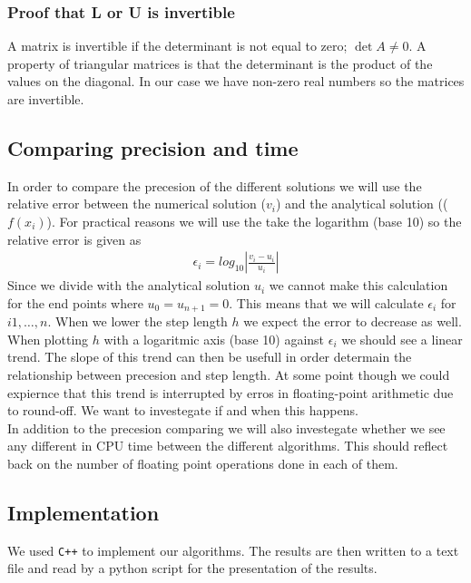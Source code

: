 \documentclass[american,a4paper,12pt]{article}
\begin{document}
\subsubsection*{Proof that L or U is invertible}
A matrix is invertible if the determinant is not equal to zero; $\det A \neq 0$. A property of triangular matrices is that the determinant is the product of the values on the diagonal. In our case we have non-zero real numbers so the matrices are invertible.

\subsection{Comparing precision and time}
In order to compare the precesion of the different solutions we will use the relative error between the numerical solution ($v_i$) and the analytical solution (($f(x_i)$). For practical reasons we will use the take the logarithm (base 10) so the relative error is given as
\begin{align*}
  \epsilon_i = log_{10}\left|\frac{v_i - u_i}{u_i}\right|
\end{align*}
Since we divide with the analytical solution $u_i$ we cannot make this calculation for the end points where $u_0 = u_{n+1} = 0$. This means that we will calculate $\epsilon_i$ for $i 1, \hdots, n$. When we lower the step length $h$ we expect the error to decrease as well. When plotting $h$ with a logaritmic axis (base 10) against $\epsilon_i$ we should see a linear trend. The slope of this trend can then be usefull in order determain the relationship between precesion and step length. At some point though we could expiernce that this trend is interrupted by erros in floating-point arithmetic due to round-off. We want to investegate if and when this happens.\\
In addition to the precesion comparing we will also investegate whether we see any different in CPU time between the different algorithms. This should reflect back on the number of floating point operations done in each of them.
\subsection{Implementation}
We used \verb!C++! to implement our algorithms. The results are then written to a text file and read by a python script for the presentation of the results.
\end{document}
